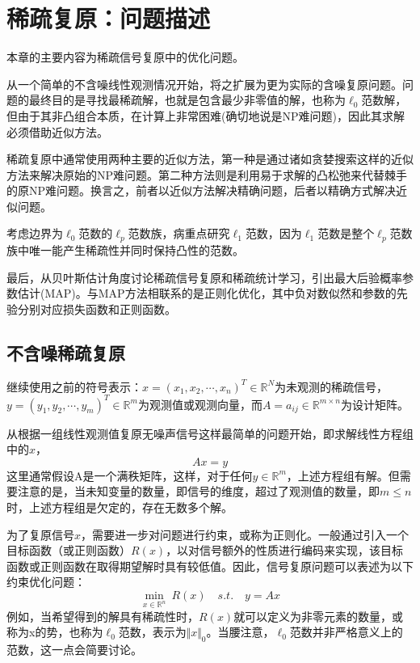 \chapter{稀疏复原：问题描述}\label{chap:srt01:problem}

本章的主要内容为稀疏信号复原中的优化问题。

从一个简单的不含噪线性观测情况开始，将之扩展为更为实际的含噪复原问题。问题的最终目的是寻找最稀疏解，也就是包含最少非零值的解，也称为$\ell_0$范数解，但由于其非凸组合本质，在计算上非常困难(确切地说是NP难问题)，因此其求解必须借助近似方法。

稀疏复原中通常使用两种主要的近似方法，第一种是通过诸如贪婪搜索这样的近似方法来解决原始的NP难问题。第二种方法则是利用易于求解的凸松弛来代替棘手的原NP难问题。换言之，前者以近似方法解决精确问题，后者以精确方式解决近似问题。

考虑边界为$ \ell_0 $范数的$ \ell_p $范数族，病重点研究$ \ell_1 $范数，因为$ \ell_1 $范数是整个$ \ell_p $范数族中唯一能产生稀疏性并同时保持凸性的范数。

最后，从贝叶斯估计角度讨论稀疏信号复原和稀疏统计学习，引出最大后验概率参数估计(MAP)。与MAP方法相联系的是正则化优化，其中负对数似然和参数的先验分别对应损失函数和正则函数。

\section{不含噪稀疏复原}

继续使用之前的符号表示：$\mathit{x}=(x_1,x_2,\cdots,x_n)^T\in \mathbb{R}^N$为未观测的稀疏信号，$ y=(y_1,y_2,\cdots,y_m)^T\in \mathbb{R}^m $为观测值或观测向量，而$ A={a_{ij}}\in \mathbb{R}^{m\times n} $为设计矩阵。

从根据一组线性观测值复原无噪声信号这样最简单的问题开始，即求解线性方程组中的$ x $，
\begin{equation}\label{key}
Ax=y
\end{equation}
这里通常假设A是一个满秩矩阵，这样，对于任何$ y\in \mathbb{R}^m $，上述方程组有解。但需要注意的是，当未知变量的数量，即信号的维度，超过了观测值的数量，即$ m\leq n $时，上述方程组是欠定的，存在无数多个解。

为了复原信号$ x $，需要进一步对问题进行约束，或称为正则化。一般通过引入一个目标函数（或正则函数）$ R(x) $，以对信号额外的性质进行编码来实现，该目标函数或正则函数在取得期望解时具有较低值。因此，信号复原问题可以表述为以下约束优化问题：
\begin{equation}\label{key}
\min_{x\in \mathbb{R}^n}\: R(x)\quad s.t.\quad y=Ax
\end{equation}
例如，当希望得到的解具有稀疏性时，$ R(x) $就可以定义为非零元素的数量，或称为x的势，也称为$ \ell_0 $范数，表示为$ \Vert x \Vert_0 $。当腰注意，$ \ell_0 $范数并非严格意义上的范数，这一点会简要讨论。

